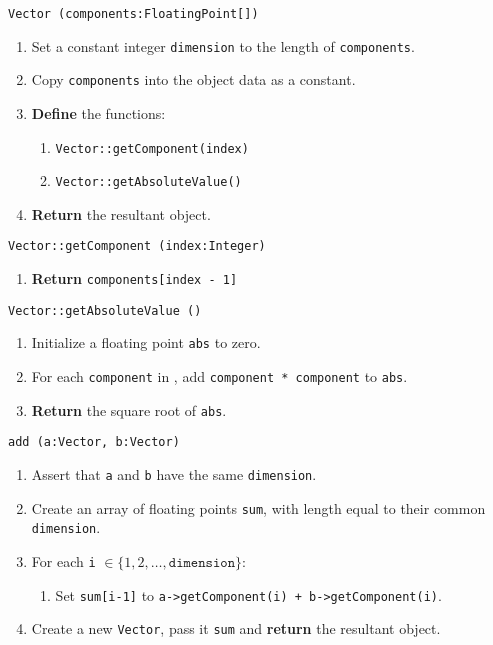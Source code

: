 \solution
\algorithm
\texttt{Vector (components:FloatingPoint[])}
\begin{enumerate}
	\item Set a constant integer \texttt{dimension} to the length of \texttt{components}.
	\item Copy \texttt{components} into the object data as a constant.
	\item \textbf{Define} the functions:
	\begin{enumerate}
		\item \texttt{Vector::getComponent(index)}
		\item \texttt{Vector::getAbsoluteValue()}
	\end{enumerate}
	\item \textbf{Return} the resultant object. 
\end{enumerate}
\vspace{5mm}
\texttt{Vector::getComponent (index:Integer)}
\begin{enumerate}
	\item \textbf{Return} \texttt{components[index - 1]}
\end{enumerate}
\vspace{5mm}
\texttt{Vector::getAbsoluteValue ()}
\begin{enumerate}
	\item Initialize a floating point \texttt{abs} to zero. 
	\item For each \texttt{component} in \texttt{}, add \texttt{component * component} to \texttt{abs}.
	\item \textbf{Return} the square root of \texttt{abs}.
\end{enumerate}
\vspace{8mm}
\texttt{add (a:Vector, b:Vector)}
\begin{enumerate}
	\item Assert that \texttt{a} and \texttt{b} have the same \texttt{dimension}. 
	\item Create an array of floating points \texttt{sum}, with length equal to their common \texttt{dimension}.
	\item For each \texttt{i}  $\in \{1, 2, \dots, \mathtt{dimension}\}$:
	\begin{enumerate}
		\item Set \texttt{sum[i-1]} to \texttt{a->getComponent(i) + b->getComponent(i)}. 
	\end{enumerate}
	\item Create a new \texttt{Vector}, pass it \texttt{sum} and \textbf{return} the resultant object. 
\end{enumerate}
